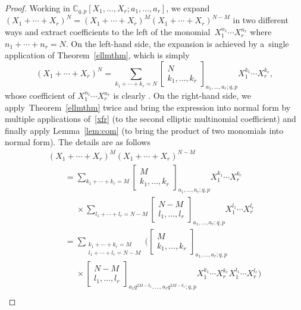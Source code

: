 \documentclass[pdftex]{sigma}
\numberwithin{equation}{section}
\theoremstyle{definition}
\newcommand{\C}{\mathbb C}
\begin{document}
\begin{proof}
 Working in $\C_{q,p}[X_1,\dots,X_r;a_1,\dots,a_r]$,
 we expand
$(X_1+\cdots+X_r)^N=(X_1+\cdots+X_r)^M(X_1+\cdots+X_r)^{N-M}$
in two different ways and extract coefficients to the left of the monomial~${X_1^{n_1}\cdots X_r^{n_r}}$ where $n_1+\cdots+n_r=N$.
On the left-hand side, the expansion is achieved by a~single application
of Theorem~\ref{ellmthm}, which is simply
\[
(X_1+\cdots+X_r)^N=
\sum_{k_1+\cdots+k_r=N}
\begin{bmatrix}N\\k_1,\dots,k_r\end{bmatrix}_{a_1,\dots,a_r;q,p}
X_1^{k_1}\cdots X_r^{k_r},
\]
whose coefficient of $X_1^{n_1}\cdots X_r^{n_r}$ is clearly
.
On the right-hand side, we apply~Theorem~\ref{ellmthm} twice
and bring the expression into normal form by multiple applications
of~\eqref{xfr} (to the second elliptic multinomial coefficient)
and finally apply Lemma~\ref{lem:com} (to bring the product of
two monomials into normal form). The details are as follows
\begin{gather*}
(X_1+\cdots+X_r)^M(X_1+\cdots+X_r)^{N-M}\\
\qquad=\sum_{k_1+\cdots+k_r=M}
\begin{bmatrix}M\\k_1,\dots,k_r\end{bmatrix}_{a_1,\dots,a_r;q,p}
X_1^{k_1}\cdots X_r^{k_r}\\
\phantom{\qquad=}{}\times\sum_{l_1+\cdots+l_r=N-M}
\begin{bmatrix}N-M\\l_1,\dots,l_r\end{bmatrix}_{a_1,\dots,a_r;q,p}
X_1^{l_1}\cdots X_r^{l_r}\\
\qquad=\sum_{\substack{k_1+\cdots+k_r=M\\l_1+\cdots+l_r=N-M}}
\biggl(\begin{bmatrix}M\\k_1,\dots,k_r\end{bmatrix}_{a_1,\dots,a_r;q,p}\\
\phantom{\qquad=}{}\times
\begin{bmatrix}N-M\\l_1,\dots,l_r\end{bmatrix}_{a_1q^{2M-k_1},\dots,a_rq^{2M-k_r};q,p}
X_1^{k_1}\cdots X_r^{k_r}X_1^{l_1}\cdots X_r^{l_r}\biggr)\\

\end{gather*}
\end{proof}
\end{document}
